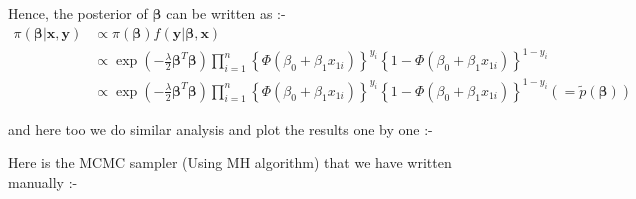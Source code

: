 \documentclass[11pt,english]{article}\usepackage[]{graphicx}\usepackage[]{xcolor}
\begin{document}
Hence, the posterior of $\boldsymbol{\beta}$ can be written as :-
\begin{align*}
\pi\left(\boldsymbol{\beta}|\boldsymbol{x},\boldsymbol{y}\right) & \propto\pi\left(\boldsymbol{\beta}\right)f\left(\boldsymbol{y}|\boldsymbol{\beta},\boldsymbol{x}\right)\\
 & \propto\exp\left(-\frac{\lambda}{2}\boldsymbol{\beta}^{T}\boldsymbol{\beta}\right)\prod_{i=1}^{n}\left\{ \Phi\left(\beta_{0}+\beta_{1}x_{1i}\right)\right\} ^{y_{i}}\left\{ 1-\Phi\left(\beta_{0}+\beta_{1}x_{1i}\right)\right\} ^{1-y_{i}}\\
 & \propto\exp\left(-\frac{\lambda}{2}\boldsymbol{\beta}^{T}\boldsymbol{\beta}\right)\prod_{i=1}^{n}\left\{ \Phi\left(\beta_{0}+\beta_{1}x_{1i}\right)\right\} ^{y_{i}}\left\{ 1-\Phi\left(\beta_{0}+\beta_{1}x_{1i}\right)\right\} ^{1-y_{i}}\left(=\widetilde{p}\left(\boldsymbol{\beta}\right)\right)
\end{align*}

and here too we do similar analysis and plot the results one by one
:-

Here is the MCMC sampler (Using MH algorithm) that we have written
manually :-
\end{document}
